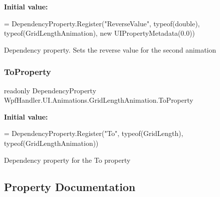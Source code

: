 {\bfseries Initial value\+:}
\begin{DoxyCode}
=
            DependencyProperty.Register(\textcolor{stringliteral}{"ReverseValue"}, typeof(\textcolor{keywordtype}{double}), typeof(GridLengthAnimation), \textcolor{keyword}{new} 
      UIPropertyMetadata(0.0))
\end{DoxyCode}


Dependency property. Sets the reverse value for the second animation 

\mbox{\label{class_wpf_handler_1_1_u_i_1_1_animations_1_1_grid_length_animation_ad46e81c2929885dacbff706b3c860146}} 
\subsubsection{\texorpdfstring{To\+Property}{ToProperty}}
{\footnotesize\ttfamily readonly Dependency\+Property Wpf\+Handler.\+U\+I.\+Animations.\+Grid\+Length\+Animation.\+To\+Property\hspace{0.3cm}{\ttfamily [static]}}

{\bfseries Initial value\+:}
\begin{DoxyCode}
= DependencyProperty.Register(\textcolor{stringliteral}{"To"}, typeof(GridLength),
                typeof(GridLengthAnimation))
\end{DoxyCode}


Dependency property for the To property 



\subsection{Property Documentation}
\mbox{\label{class_wpf_handler_1_1_u_i_1_1_animations_1_1_grid_length_animation_a6985f4dbd3e753ed873302a37ff542fe}} 
